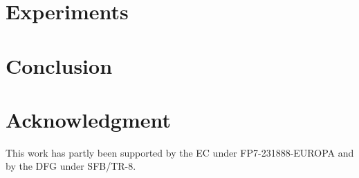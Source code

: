 \documentclass[letterpaper, 10 pt, conference]{sty/ieeeconf}
\begin{document}
\section{Experiments\label{sec:exp}}


\section{Conclusion\label{sec:conc}}


\section*{Acknowledgment}
This work has partly been supported by the EC under FP7-231888-EUROPA and by the
DFG under SFB/TR-8.



\end{document}
